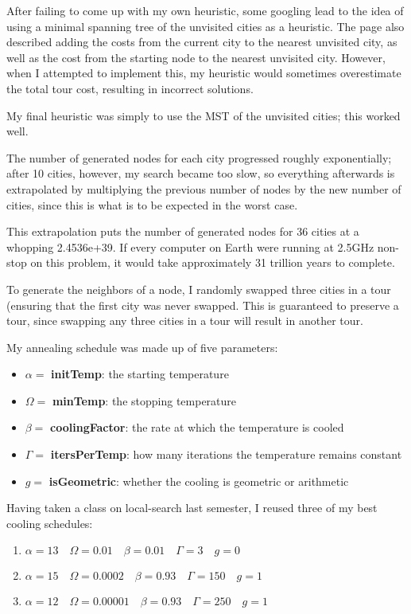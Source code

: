 \documentclass[12pt]{article}
\begin{document}
\problemasub
After failing to come up with my own heuristic, some googling lead to the idea of using a minimal spanning tree of the
unvisited cities as a heuristic. The page also described adding the costs from the current city to the nearest unvisited
city, as well as the cost from the starting node to the nearest unvisited city. However, when I attempted to implement
this, my heuristic would sometimes overestimate the total tour cost, resulting in incorrect solutions.

My final heuristic was simply to use the MST of the unvisited cities; this worked well.

\problemasub
{}
The number of generated nodes for each city progressed roughly exponentially; after 10 cities, however, my search became
too slow, so everything afterwards is extrapolated by multiplying the previous number of nodes by the new number of
cities, since this is what is to be expected in the worst case.

This extrapolation puts the number of generated nodes for 36 cities at a whopping 2.4536e+39. If every computer on Earth
were running at 2.5GHz non-stop on this problem, it would take approximately 31 trillion years to complete.



\problemasub
To generate the neighbors of a node, I randomly swapped three cities in a tour (ensuring that the first city was never
swapped. This is guaranteed to preserve a tour, since swapping any three cities in a tour will result in another tour.

\problemasub
My annealing schedule was made up of five parameters:
\begin{itemize}
    \item $\alpha = $ \textbf{initTemp}: the starting temperature
    \item $\Omega = $ \textbf{minTemp}: the stopping temperature
    \item $\beta = $ \textbf{coolingFactor}: the rate at which the temperature is cooled
    \item $\Gamma = $ \textbf{itersPerTemp}: how many iterations the temperature remains constant
    \item $g = $ \textbf{isGeometric}: whether the cooling is geometric or arithmetic
\end{itemize}

Having taken a class on local-search last semester, I reused three of my best cooling schedules:
\begin{enumerate}
    \item $\alpha = 13\quad \Omega = 0.01\quad \beta = 0.01\quad \Gamma = 3\quad g = 0$
    \item $\alpha = 15\quad \Omega = 0.0002\quad \beta = 0.93\quad \Gamma = 150\quad g = 1$
    \item $\alpha = 12\quad \Omega = 0.00001\quad \beta = 0.93\quad \Gamma = 250\quad g = 1$
\end{enumerate}
\end{document}
